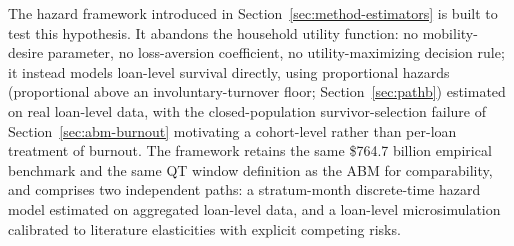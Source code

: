 \documentclass[12pt]{article}
\begin{document}
The hazard framework introduced in Section~\ref{sec:method-estimators} is built to test this hypothesis. It abandons the household utility function: no mobility-desire parameter, no loss-aversion coefficient, no utility-maximizing decision rule; it instead models loan-level survival directly, using proportional hazards (proportional above an involuntary-turnover floor; Section~\ref{sec:pathb}) estimated on real loan-level data, with the closed-population survivor-selection failure of Section~\ref{sec:abm-burnout} motivating a cohort-level rather than per-loan treatment of burnout. The framework retains the same \$764.7 billion empirical benchmark and the same QT window definition as the ABM for comparability, and comprises two independent paths: a stratum-month discrete-time hazard model estimated on aggregated loan-level data, and a loan-level microsimulation calibrated to literature elasticities with explicit competing risks.
\end{document}
